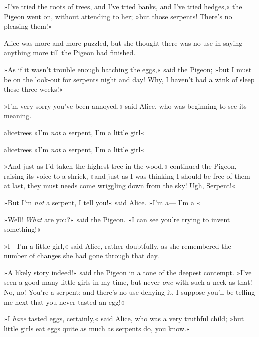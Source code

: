 »I've tried the roots of trees, and I've tried banks, and I've tried hedges,« the Pigeon went on, without attending to her; »but those serpents! There's no pleasing them!«

Alice was more and more puzzled, but she thought there was no use in saying anything more till the Pigeon had finished.

»As if it wasn't trouble enough hatching the eggs,« said the Pigeon; »but I must be on the look-out for serpents night and day! Why, I haven't had a wink of sleep these three weeks!«

»I'm very sorry you've been annoyed,« said Alice, who was beginning to see its meaning.

\begin{pictures}
	\begin{letter}
		\begin{bwbigpic}
			[1.1]
			{alicetrees}
			{»I'm \textit{not} a serpent, I'm a little girl«}
		\end{bwbigpic}
	\end{letter}
	\begin{a4}
		\begin{bwbigpic}
			[1.0]
			{alicetrees}
			{»I'm \textit{not} a serpent, I'm a little girl«}
		\end{bwbigpic}
	\end{a4}
\end{pictures}


»And just as I'd taken the highest tree in the wood,« continued the Pigeon, raising its voice to a shriek, »and just as I was thinking I should be free of them at last, they must needs come wriggling down from the sky! Ugh, Serpent!«

»But I'm \textit{not} a serpent, I tell you!« said Alice. »I'm a— I'm a \longdash«

»Well! \textit{What} are you?« said the Pigeon. »I can see you're trying to invent something!«

»I—I'm a little girl,« said Alice, rather doubtfully, as she remembered the number of changes she had gone through that day.

»A likely story indeed!« said the Pigeon in a tone of the deepest contempt. »I've seen a good many little girls in my time, but never \textit{one} with such a neck as that! No, no! You're a serpent; and there's no use denying it. I suppose you'll be telling me next that you never tasted an egg!«

»I \textit{have} tasted eggs, certainly,« said Alice, who was a very truthful child; »but little girls eat eggs quite as much as serpents do, you know.«

